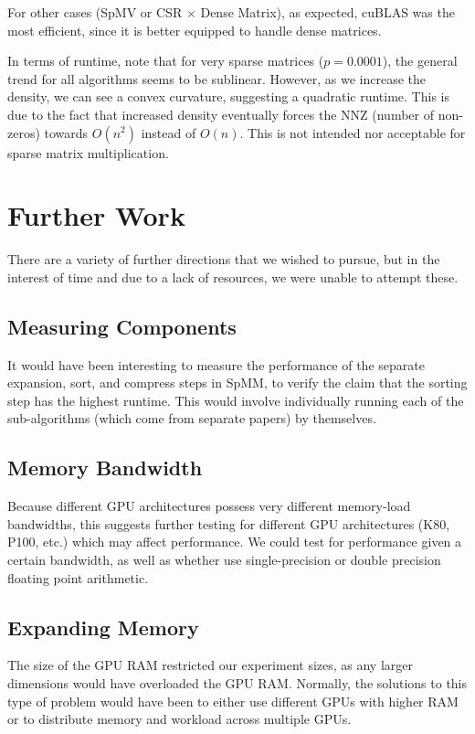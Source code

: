 \documentclass[12pt]{article}
\begin{document}
\hspace{0.5cm}For other cases (SpMV or CSR $\times$ Dense Matrix), as expected, cuBLAS was the most efficient, since it is better equipped to handle dense matrices.

\hspace{0.5cm}In terms of runtime, note that for very sparse matrices ($p = 0.0001$), the general trend for all algorithms seems to be sublinear. However, as we increase the density, we can see a convex curvature, suggesting a quadratic runtime. This is due to the fact that increased density eventually forces the NNZ (number of non-zeros) towards $O(n^{2})$ instead of $O(n)$. This is not intended nor acceptable for sparse matrix multiplication. 

\section{Further Work}
\hspace{0.5cm}There are a variety of further directions that we wished to pursue, but in the interest of time and due to a lack of resources, we were unable to attempt these.
\subsection{Measuring Components}
\hspace{0.5cm}It would have been interesting to measure the performance of the separate expansion, sort, and compress steps in SpMM, to verify the claim that the sorting step has the highest runtime. This would involve individually running each of the sub-algorithms (which come from separate papers) by themselves.

\subsection{Memory Bandwidth}
\hspace{0.5cm}Because different GPU architectures possess very different memory-load bandwidths, this suggests further testing for different GPU architectures (K80, P100, etc.) which may affect performance. We could test for performance given a certain bandwidth, as well as whether use single-precision or double precision floating point arithmetic. 

\subsection{Expanding Memory}
\hspace{0.5cm}The size of the GPU RAM restricted our experiment sizes, as any larger dimensions would have overloaded the GPU RAM. Normally, the solutions to this type of problem would have been to either use different GPUs with higher RAM or to distribute memory and workload across multiple GPUs.
\end{document}
